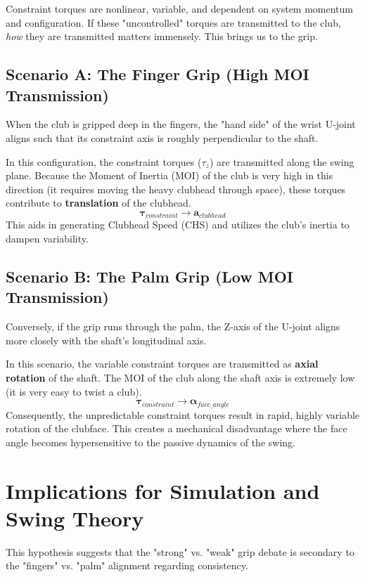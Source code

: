 \documentclass{article}
\begin{document}
Constraint torques are nonlinear, variable, and dependent on system momentum and configuration. If these "uncontrolled" torques are transmitted to the club, \textit{how} they are transmitted matters immensely. This brings us to the grip.

\subsection{Scenario A: The Finger Grip (High MOI Transmission)}
When the club is gripped deep in the fingers, the "hand side" of the wrist U-joint aligns such that its constraint axis is roughly perpendicular to the shaft. 

In this configuration, the constraint torques ($\tau_z$) are transmitted along the swing plane. Because the Moment of Inertia (MOI) of the club is very high in this direction (it requires moving the heavy clubhead through space), these torques contribute to \textbf{translation} of the clubhead.
$$ \boldsymbol{\tau}_{constraint} \rightarrow \boldsymbol{a}_{clubhead} $$
This aids in generating Clubhead Speed (CHS) and utilizes the club's inertia to dampen variability.

\subsection{Scenario B: The Palm Grip (Low MOI Transmission)}
Conversely, if the grip runs through the palm, the Z-axis of the U-joint aligns more closely with the shaft's longitudinal axis.


In this scenario, the variable constraint torques are transmitted as \textbf{axial rotation} of the shaft. The MOI of the club along the shaft axis is extremely low (it is very easy to twist a club).
$$ \boldsymbol{\tau}_{constraint} \rightarrow \boldsymbol{\alpha}_{face\_angle} $$
Consequently, the unpredictable constraint torques result in rapid, highly variable rotation of the clubface. This creates a mechanical disadvantage where the face angle becomes hypersensitive to the passive dynamics of the swing.

\section{Implications for Simulation and Swing Theory}

This hypothesis suggests that the "strong" vs. "weak" grip debate is secondary to the "fingers" vs. "palm" alignment regarding consistency.
\end{document}
